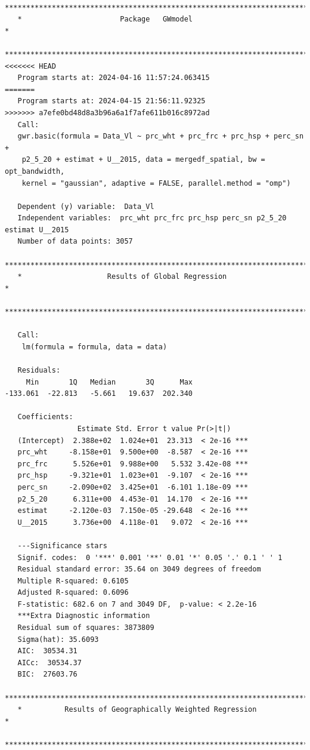\documentclass[
]{article}
\begin{document}
\begin{verbatim}
   ***********************************************************************
   *                       Package   GWmodel                             *
   ***********************************************************************
<<<<<<< HEAD
   Program starts at: 2024-04-16 11:57:24.063415 
=======
   Program starts at: 2024-04-15 21:56:11.92325 
>>>>>>> a7efe0bd48d8a3b96a6a1f7afe611b016c8972ad
   Call:
   gwr.basic(formula = Data_Vl ~ prc_wht + prc_frc + prc_hsp + perc_sn + 
    p2_5_20 + estimat + U__2015, data = mergedf_spatial, bw = opt_bandwidth, 
    kernel = "gaussian", adaptive = FALSE, parallel.method = "omp")

   Dependent (y) variable:  Data_Vl
   Independent variables:  prc_wht prc_frc prc_hsp perc_sn p2_5_20 estimat U__2015
   Number of data points: 3057
   ***********************************************************************
   *                    Results of Global Regression                     *
   ***********************************************************************

   Call:
    lm(formula = formula, data = data)

   Residuals:
     Min       1Q   Median       3Q      Max 
-133.061  -22.813   -5.661   19.637  202.340 

   Coefficients:
                 Estimate Std. Error t value Pr(>|t|)    
   (Intercept)  2.388e+02  1.024e+01  23.313  < 2e-16 ***
   prc_wht     -8.158e+01  9.500e+00  -8.587  < 2e-16 ***
   prc_frc      5.526e+01  9.988e+00   5.532 3.42e-08 ***
   prc_hsp     -9.321e+01  1.023e+01  -9.107  < 2e-16 ***
   perc_sn     -2.090e+02  3.425e+01  -6.101 1.18e-09 ***
   p2_5_20      6.311e+00  4.453e-01  14.170  < 2e-16 ***
   estimat     -2.120e-03  7.150e-05 -29.648  < 2e-16 ***
   U__2015      3.736e+00  4.118e-01   9.072  < 2e-16 ***

   ---Significance stars
   Signif. codes:  0 '***' 0.001 '**' 0.01 '*' 0.05 '.' 0.1 ' ' 1 
   Residual standard error: 35.64 on 3049 degrees of freedom
   Multiple R-squared: 0.6105
   Adjusted R-squared: 0.6096 
   F-statistic: 682.6 on 7 and 3049 DF,  p-value: < 2.2e-16 
   ***Extra Diagnostic information
   Residual sum of squares: 3873809
   Sigma(hat): 35.6093
   AIC:  30534.31
   AICc:  30534.37
   BIC:  27603.76
   ***********************************************************************
   *          Results of Geographically Weighted Regression              *
   ***********************************************************************


\end{verbatim}
\end{document}

